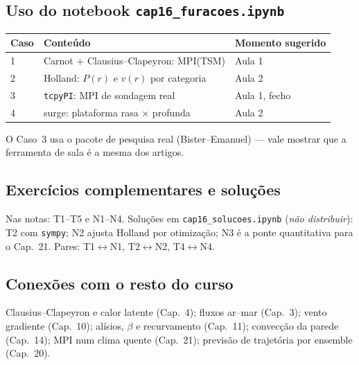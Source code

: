 \subsection*{Uso do notebook \texttt{cap16\_furacoes.ipynb}}

\begin{center}
\begin{tabular}{lll}
\hline
Caso & Conteúdo & Momento sugerido \\
\hline
1 & Carnot + Clausius--Clapeyron: MPI(TSM) & Aula 1 \\
2 & Holland: $P(r)$ e $v(r)$ por categoria & Aula 2 \\
3 & \texttt{tcpyPI}: MPI de sondagem real & Aula 1, fecho \\
4 & surge: plataforma rasa × profunda & Aula 2 \\
\hline
\end{tabular}
\end{center}

O Caso~3 usa o pacote de pesquisa real (Bister--Emanuel) — vale
mostrar que a ferramenta de sala é a mesma dos artigos.

\subsection*{Exercícios complementares e soluções}

Nas notas: T1--T5 e N1--N4. Soluções em \texttt{cap16\_solucoes.ipynb}
(\emph{não distribuir}): T2 com \texttt{sympy}; N2 ajusta Holland por
otimização; N3 é a ponte quantitativa para o Cap.~21. Pares:
T1$\leftrightarrow$N1, T2$\leftrightarrow$N2, T4$\leftrightarrow$N4.

\subsection*{Conexões com o resto do curso}

Clausius--Clapeyron e calor latente (Cap.~4); fluxos ar--mar
(Cap.~3); vento gradiente (Cap.~10); alísios, $\beta$ e recurvamento
(Cap.~11); convecção da parede (Cap.~14); MPI num clima quente
(Cap.~21); previsão de trajetória por ensemble (Cap.~20).
